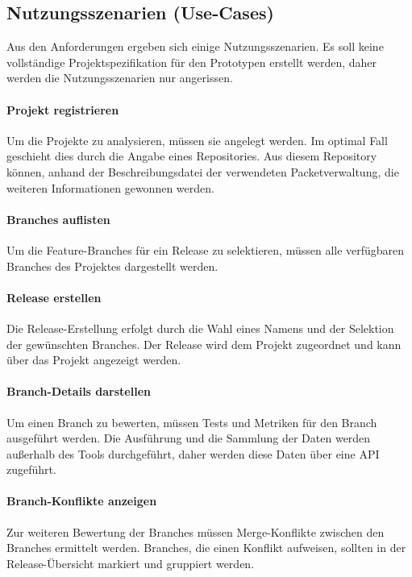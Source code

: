 \subsection{Nutzungsszenarien (Use-Cases)}

Aus den Anforderungen ergeben sich einige Nutzungsszenarien. Es soll keine vollständige Projektspezifikation für den Prototypen erstellt werden, daher werden die Nutzungsszenarien nur angerissen. 

\paragraph{Projekt registrieren}
Um die Projekte zu analysieren, müssen sie angelegt werden. Im optimal Fall geschieht dies durch die Angabe eines Repositories. Aus diesem Repository können, anhand der Beschreibungsdatei der verwendeten Packetverwaltung, die weiteren Informationen gewonnen werden.

\paragraph{Branches auflisten}
Um die Feature-Branches für ein Release zu selektieren, müssen alle verfügbaren Branches des Projektes dargestellt werden. 

\paragraph{Release erstellen}
Die Release-Erstellung erfolgt durch die Wahl eines Namens und der Selektion der gewünschten Branches. Der Release wird dem Projekt zugeordnet und kann über das Projekt angezeigt werden.

\paragraph{Branch-Details darstellen}
Um einen Branch zu bewerten, müssen Tests und Metriken für den Branch ausgeführt werden. Die Ausführung und die Sammlung der Daten werden außerhalb des Tools durchgeführt, daher werden diese Daten über eine API zugeführt.

\paragraph{Branch-Konflikte anzeigen}
Zur weiteren Bewertung der Branches müssen Merge-Konflikte zwischen den Branches ermittelt werden. Branches, die einen Konflikt aufweisen, sollten in der Release-Übersicht markiert und gruppiert werden.

